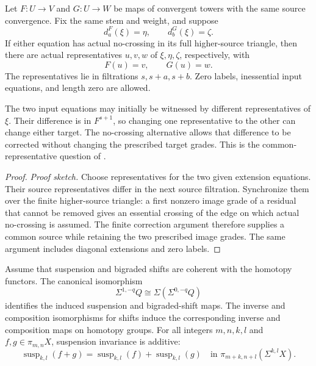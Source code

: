 \begin{theorem}
\label{sem:ProofTools:mh-common-source}
Let $F:U\to V$ and $G:U\to W$ be maps of convergent towers with the same source convergence. Fix the same stem and weight, and suppose
\[
d_a^F(\xi)=\eta,\qquad d_b^G(\xi)=\zeta.
\]
If either equation has actual no-crossing in its full higher-source triangle, then there are actual representatives $u,v,w$ of $\xi,\eta,\zeta$, respectively, with
\[F(u)=v,\qquad G(u)=w.\]
The representatives lie in filtrations $s,s+a,s+b$. Zero labels, inessential input equations, and length zero are allowed.

The two input equations may initially be witnessed by different representatives of $\xi$. Their difference is in $F^{s+1}$, so changing one representative to the other can change either target. The no-crossing alternative allows that difference to be corrected without changing the prescribed target grades. This is the common-representative question of \cite[Remark 6.18]{LWX126}.
\end{theorem}
\begin{proof}
\textit{Proof sketch.}
Choose representatives for the two given extension equations. Their source representatives differ in the next source filtration. Synchronize them over the finite higher-source triangle: a first nonzero image grade of a residual that cannot be removed gives an essential crossing of the edge on which actual no-crossing is assumed. The finite correction argument therefore supplies a common source while retaining the two prescribed image grades. The same argument includes diagonal extensions and zero labels.
\end{proof}

Assume that suspension and bigraded shifts are coherent with the homotopy functors. The canonical isomorphism
\[\Sigma^{1,-q}Q\cong\Sigma(\Sigma^{0,-q}Q)\]
identifies the induced suspension and bigraded-shift maps. The inverse and composition isomorphisms for shifts induce the corresponding inverse and composition maps on homotopy groups.
For all integers $m,n,k,l$ and $f,g\in\pi_{m,n}X$, suspension invariance is additive:
\[
\operatorname{susp}_{k,l}(f+g)=\operatorname{susp}_{k,l}(f)+\operatorname{susp}_{k,l}(g)
\quad\text{in }\pi_{m+k,n+l}(\Sigma^{k,l}X).
\]

